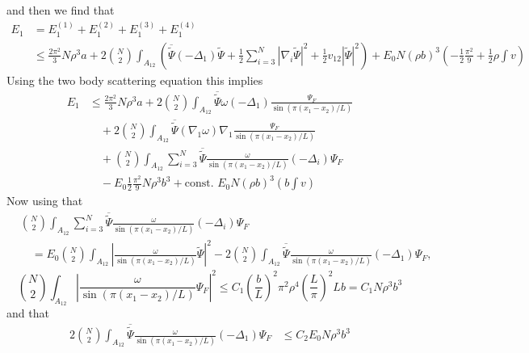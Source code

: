 \documentclass[a4paper,11pt]{article}
\newcommand{\abs}[1]{\left\lvert #1 \right\rvert}
\numberwithin{equation}{section}
\begin{document}
	 and then we find that \begin{equation}
	\begin{aligned}
	E_1&=E_1^{(1)}+E_1^{(2)}+E_1^{(3)}+E_1^{(4)}\\&\leq \frac{2\pi^2}{3}N\rho^3 a+2\binom{N}{2}\int_{A_{12}}\left(\overline{\tilde{\Psi}}(-\Delta_1)\tilde{\Psi}+\frac{1}{2}\sum_{i=3}^{N}\abs{\nabla_i\tilde{\Psi}}^2+\frac{1}{2}v_{12}\abs{\tilde{\Psi}}^2\right)+E_0N(\rho b)^3\left(-\frac{1}{2}\frac{\pi^2}{9}+\frac{1}{2}\rho \int v\right)
	\end{aligned}
	\end{equation}
	Using the two body scattering equation this implies \begin{equation}
	\begin{aligned}
	E_1&\leq \frac{2\pi^2}{3}N\rho^3 a+2\binom{N}{2}\int_{A_{12}}\overline{\tilde{\Psi}}\omega(-\Delta_1)\frac{\Psi_F}{\sin(\pi(x_1-x_2)/L)}\\&\quad+2\binom{N}{2}\int_{A_{12}}\overline{\tilde{\Psi}}(\nabla_1\omega)\nabla_1\frac{\Psi_F}{\sin(\pi(x_1-x_2)/L)}\\
	&\quad +\binom{N}{2}\int_{A_{12}}\sum_{i=3}^{N} \overline{\tilde{\Psi}}\frac{\omega}{\sin(\pi(x_1-x_2)/L)}(-\Delta_i)\Psi_F
	\\&\quad-E_0\frac{1}{2}\frac{\pi^2}{9}N\rho^3b^3+\text{const. }E_0 N (\rho b)^3 \left(b\int v\right)
	\end{aligned}
	\end{equation}
	Now using that \begin{equation}
	\begin{aligned}
	&\binom{N}{2}\int_{A_{12}}\sum_{i=3}^{N} \overline{\tilde{\Psi}}\frac{\omega}{\sin(\pi(x_1-x_2)/L)}(-\Delta_i)\Psi_F\\&\quad=E_0\binom{N}{2}\int_{A_{12}}\left\lvert\frac{\omega}{\sin(\pi(x_1-x_2)/L)}\tilde{\Psi}\right\rvert^2-2\binom{N}{2}\int_{A_{12}} \overline{\tilde{\Psi}}\frac{\omega}{\sin(\pi(x_1-x_2)/L)}(-\Delta_1)\Psi_F,
	\end{aligned}
	\end{equation}
	 \begin{equation}
	\binom{N}{2}\int_{A_{12}}\left\lvert\frac{\omega}{\sin(\pi(x_1-x_2)/L)}\Psi_F\right\rvert^2\leq C_1 \left(\frac{b}{L}\right)^2\pi^2\rho^4 \left(\frac{L}{\pi}\right)^2 L b=C_1N\rho^3 b^3
	\end{equation}
	and that \begin{equation}
	\begin{aligned}
	2\binom{N}{2}\int_{A_{12}} \overline{\tilde{\Psi}}\frac{\omega}{\sin(\pi(x_1-x_2)/L)}(-\Delta_1)\Psi_F&\leq C_2 E_0 N\rho^3b^3
	\end{aligned}
	\end{equation}
\end{document}
